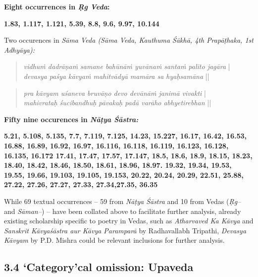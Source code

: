 \textbf{Eight occurrences in \textit{Ṛg Veda}:}

\textbf{1.83, 1.117, 1.121, 5.39, 8.8, 9.6, 9.97, 10.144}

Two occurences in \textit{Sāma Veda (Sāma Veda, Kauthuma Śākhā, 4th Prapāṭhaka, 1st Adhyāya):}

\vskip 4pt

\begin{verse}
\textit{vidhuṁ dadrāṇaṁ samane bahūnāṁ yuvānaṁ santaṁ palito jagāra} |\\\textit{devasya paśya kāvyaṁ mahitvādyā mamāra sa hyaḥ\break samāna} || 
\end{verse}

\vskip 4pt

\begin{verse}
\textit{pra kāvyam uśaneva bruvāṇo devo devānāṁ janimā vivakti} |\\\textit{mahivrataḥ śucibandhuḥ pāvakaḥ padā varāho abhyeti\break rebhan} || 
\end{verse}

\vskip 4pt

\newpage

\textbf{Fifty nine occurences in \textit{Nāṭya Śāstra:}}

\textbf{5.21, 5.108, 5.135, 7.7, 7.119, 7.125, 14.23, 15.227, 16.17, 16.42, 16.53, 16.88, 16.89, 16.92, 16.97, 16.116, 16.118, 16.119, 16.123, 16.128, 16.135, 16.172 17.41, 17.47, 17.57, 17.147, 18.5, 18.6, 18.9, 18.15, 18.23, 18.40, 18.42, 18.46, 18.50, 18.61, 18.96, 18.97. 19.32, 19.34, 19.53, 19.55, 19.66, 19.103, 19.105, 19.153, 20.22, 20.24, 20.29, 22.51, 25.88, 27.22, 27.26, 27.27, 27.33, 27.34,27.35, 36.35}

While 69 textual occurrences – 59 from \textit{Nāṭya Śāstra} and 10 from Vedas (\textit{Ṛg–} and \textit{Sāman–}) – have been collated above to facilitate further analysis, already existing scholarship specific to poetry in Vedas, such as \textit{Atharvaved Ka Kāvya} and \textit{Sanskrit Kāvyaśāstra aur Kāvya Paramparā} by Radhavallabh Tripathi, \textit{Devasya Kāvyam} by P.D. Mishra could be relevant inclusions for further analysis.


\subsection*{3.4 ‘Category'cal omission: Upaveda}


